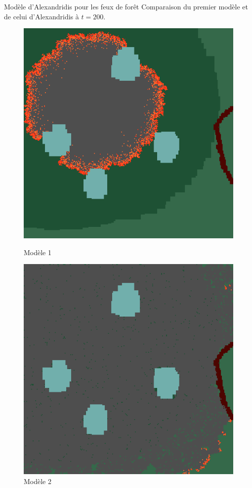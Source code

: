 \documentclass{beamer}
\begin{document}
\begin{frame}{Modèle d'Alexandridis pour les feux de forêt \hyperlink{jump}{\beamerbutton{ }} \hypertarget{9}{\beamerbutton{ }}}
    Comparaison du premier modèle et de celui d'Alexandridis à $t=200$.
    
    \begin{figure}[!htb]
        \begin{minipage}{0.48\textwidth}
          \centering
          \includegraphics[width=.8\linewidth]{pictures/model1/land_200.png}
          \caption{Modèle 1}\label{Fig:Data1}
        \end{minipage}\hfill
        \begin{minipage}{0.48\textwidth}
          \centering
          \includegraphics[width=.8\linewidth]{pictures/model2/land_200_nowind.png}
          \caption{Modèle 2}\label{Fig:Data2}
        \end{minipage}
     \end{figure}
\end{frame}
\end{document}
